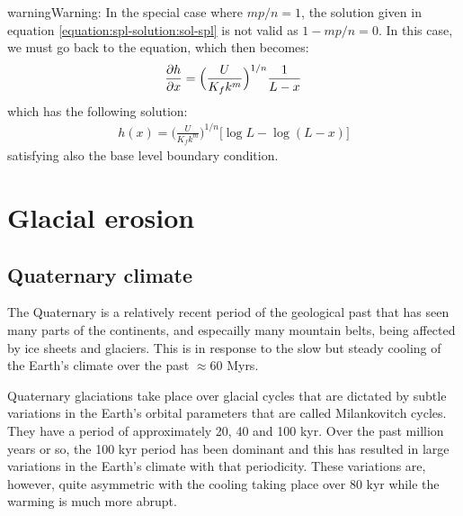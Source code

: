 \documentclass[letterpaper,10pt,english]{jupyterBook}
\begin{document}
\begin{sphinxadmonition}{warning}{Warning:}
\sphinxAtStartPar
In the special case where \(mp/n=1\), the solution given in equation \eqref{equation:spl-solution:sol-spl} is not valid as \(1-mp/n=0\). In this case, we must go back to the equation, which then becomes:
\begin{equation*}
\begin{split}\frac{\partial h}{\partial x}=\Bigl(\frac{U}{K_fk^m}\Bigr)^{1/n}\frac{1}{L-x}\end{split}
\end{equation*}
\sphinxAtStartPar
which has the following solution:
\begin{equation*}
\begin{split}h(x)=\Bigr(\frac{U}{K_fk^m}\Bigr)^{1/n}\bigl[\log L-\log(L-x)]\end{split}
\end{equation*}
\sphinxAtStartPar
satisfying also the base level boundary condition.
\end{sphinxadmonition}

\sphinxstepscope


\section{Glacial erosion}
\label{\detokenize{glacial:glacial-erosion}}\label{\detokenize{glacial::doc}}

\subsection{Quaternary climate}
\label{\detokenize{glacial:quaternary-climate}}
\sphinxAtStartPar
The Quaternary is a relatively recent period of the geological past that has seen many parts of the continents, and especailly many mountain belts, being affected by ice sheets and glaciers. This is in response to the slow but steady cooling of the Earth’s climate over the past \(\approx60\) Myrs.

\sphinxAtStartPar
Quaternary glaciations take place over glacial cycles that are dictated by subtle variations in the Earth’s orbital parameters that are called Milankovitch cycles. They have a period of approximately 20, 40 and 100 kyr. Over the past million years or so, the 100 kyr period has been dominant and this has resulted in large variations in the Earth’s climate with that periodicity. These variations are, however, quite asymmetric with the cooling taking place over 80 kyr while the warming is much more abrupt.
\end{document}
